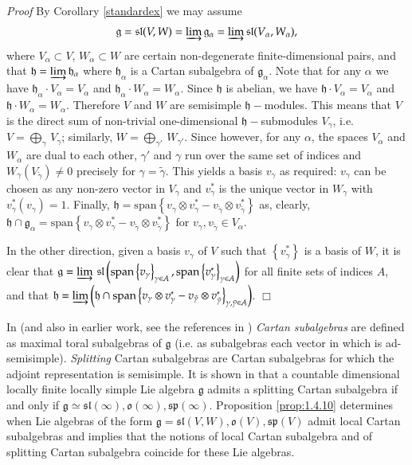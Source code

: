 \documentclass{svmult}
\renewenvironment{proof}{ \emph{Proof}}{$\Box$}
\renewcommand{\sp}{\mathfrak{sp}}
\renewcommand{\sl}{\mathfrak{sl}}
\newcommand{\oo}{\mathfrak{o}}
\newcommand{\hh}{\mathfrak{h}}
\renewcommand{\gg}{\mathfrak{g}}
\renewcommand{\span}{\mathrm{span}}
\begin{document}
\begin{proof}
By Corollary \ref{standardex} we may assume $$\gg=\sl(V,W)=\varinjlim
\gg_\alpha=\varinjlim\sl(V_\alpha, W_\alpha),$$ 
where $V_\alpha \subset V$, $W_\alpha \subset W$ 
are certain non-degenerate finite-dimensional pairs, and that
$\hh=\varinjlim \hh_\alpha$ where $\hh_\alpha$ is a 
Cartan subalgebra of $\gg_\alpha$. Note that
for any $\alpha$ we have $\hh_\alpha\cdot V_\alpha=V_\alpha$ and  $\hh_\alpha\cdot  W_\alpha=W_\alpha$. Since $\hh$ is abelian, we have $\hh\cdot V_\alpha=V_\alpha$ and 
$\hh\cdot W_\alpha=W_\alpha$. Therefore $V$ and $W$ are semisimple $\hh-$modules.
This means that $V$ is the direct sum of non-trivial one-dimensional
$\hh-$submodules $V_\gamma$, i.e. 
$V=\bigoplus_\gamma\,V_\gamma$; similarly, 
$W = \bigoplus_{\gamma'}\,W_{\gamma'}$. 
Since however, for any $\alpha$, the spaces $V_{\alpha}$ and $W_{\alpha}$ are dual to each other, 
$\gamma'$ and $\gamma$ run over the same set of indices and
$W_\gamma(V_{\tilde\gamma}) \neq 0$ precisely for 
$\gamma = \tilde{\gamma}$. 
This yields a basis $v_\gamma$ as required: $v_\gamma$ can be chosen
as any non-zero vector in $V_\gamma$ and 
$v^*_{\gamma}$ is the unique vector in 
$W_{\gamma}$ with $v_{\gamma}^*(v_{\gamma})= 1$. 
Finally, 
$\hh = \span\left\lbrace v_\gamma \otimes v_\gamma^* - v_{\tilde\gamma} \otimes v_{\tilde\gamma}^*\right\rbrace$ as, clearly, 
$\hh\cap\gg_{\alpha}=\span\left\lbrace v_\gamma \otimes v_\gamma^* -v_{\tilde\gamma} \otimes v_{\tilde\gamma}^*\right\rbrace$ 
for $v_\gamma, v_{\tilde\gamma}\in V_\alpha$.

In the other direction, given a basis $v_\gamma$ of $V$ such that $\left\lbrace v_\gamma^* \right\rbrace$ is a basis of $W$, it is clear that 
$\gg = \varinjlim\,\sl\left(\span\left\lbrace v_\gamma\right\rbrace_{\gamma \in A}, \span\left\lbrace
v_\gamma^*\right\rbrace_{\gamma \in A}\right)$ 
for all 
finite sets of indices $A$, and that 
$\hh = \varinjlim \left(\hh \cap \span\left\lbrace v_{\gamma} \otimes v_\gamma^* - v_{\tilde\gamma} \otimes v_{\tilde\gamma}^*\right\rbrace_{\gamma,\tilde\gamma \in A}\right)$.
\end{proof}
 
In \cite{DPSn} (and also in earlier work, see the references in
\cite{DPSn}) \textit{Cartan subalgebras} are 
defined as maximal toral subalgebras of $\gg$ 
(i.e. as subalgebras each vector in which is
ad-semisimple). \textit{Splitting} 
Cartan subalgebras are Cartan subalgebras for which the adjoint 
representation is semisimple. It is shown in \cite{pstr} that a
countable dimensional locally finite 
locally simple Lie algebra $\gg$ admits a splitting 
Cartan subalgebra if and only if $\gg \simeq \sl(\infty), \oo(\infty),
\sp(\infty)$. Proposition \ref{prop:1.4.10} determines when Lie algebras of the form $\gg = \sl(V,W), \oo(V), \sp(V)$ admit local Cartan subalgebras and implies that the notions of local Cartan subalgebra and of splitting Cartan subalgebra coincide for these Lie algebras. 
\end{document}
